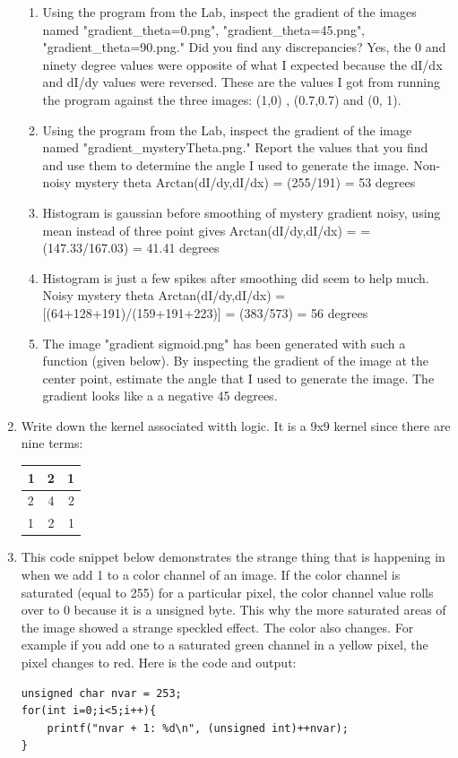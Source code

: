 \documentclass{article}
\begin{document}
\begin{enumerate}
\begin{enumerate}
	\item Using the program from the Lab, inspect the gradient of the images named "gradient_theta=0.png", "gradient_theta=45.png", "gradient_theta=90.png." Did you find any discrepancies? 
	\linebreak
	Yes, the 0 and ninety degree values were opposite of what I expected because the dI/dx and dI/dy values were reversed. These are the values I got from running the program against the three images: (1,0) , (0.7,0.7) and (0, 1).
	\item Using the program from the Lab, inspect the gradient of the image named "gradient_mysteryTheta.png." Report the values that you find and use them to determine the angle I used to generate the image.
	\linebreak
	Non-noisy mystery theta Arctan(dI/dy,dI/dx) = (255/191) = 53 degrees
	\item
	Histogram is gaussian before smoothing of mystery gradient noisy, using mean instead of three point gives Arctan(dI/dy,dI/dx) =  = (147.33/167.03) = 41.41 degrees
	\item 
	Histogram is just a few spikes after smoothing did seem to help much. Noisy mystery theta Arctan(dI/dy,dI/dx) = [(64+128+191)/(159+191+223)] = (383/573) = 56 degrees
	\item The image "gradient sigmoid.png" has been generated with such a function (given below). By inspecting the gradient of the image at the center point, estimate the angle that I used to generate the image.
	\linebreak
	The gradient looks like a a negative 45 degrees.
\end{enumerate}

\item Write down the kernel associated witth logic. It is a 9x9 kernel since there are nine terms:
\begin{tabular}{| l |c |r |}
\hline
1 &	2 &	1 \\
\hline
2 &	4 &	2 \\	
\hline
1 &	2 &	1 \\
\hline
\end{tabular}


	
\item
This code snippet below demonstrates the strange thing that is happening in when we add 1 to a color channel of an image. If the color channel is saturated (equal to 255) for a particular pixel, the color channel value rolls over to 0 because it is a unsigned byte. This why the more saturated areas of the image showed a strange speckled effect. The color also changes. For example if you add one to a saturated green channel in a  yellow pixel, the pixel changes to red.
\newline\newline
Here is the code and output:
\begin{lstlisting}
unsigned char nvar = 253;
for(int i=0;i<5;i++){
    printf("nvar + 1: %d\n", (unsigned int)++nvar);
}
\end{lstlisting}


\end{enumerate}
\end{document}
